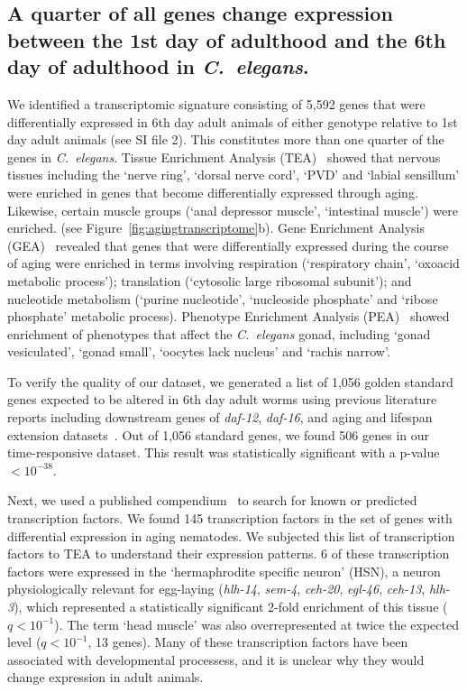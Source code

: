 \documentclass[9pt,twocolumn,twoside]{gsajnl}
\newcommand{\cel}{\emph{C.~elegans}}
\newcommand{\gene}[1]{\emph{\mbox{#1}}}
\newcommand{\agen}{5,592}
\newcommand{\tfaging}{145}
\newcommand{\goldn}{1,056}
\newcommand{\goldfound}{506}
\newcommand{\goldpval}{$<10^{-38}$}
\begin{document}
\subsection{A quarter of all genes change expression between the 1st day of
             adulthood and the 6th day of adulthood in \cel{}.}
We identified a transcriptomic signature consisting of \agen{} genes that were
differentially expressed in 6th day adult animals of either genotype relative
to 1st day adult animals (see SI file 2). This constitutes more than one quarter
of the genes in \cel{}. Tissue Enrichment Analysis (TEA)~\citep{Angeles-Albores2016}
showed that nervous tissues including the `nerve ring', `dorsal nerve cord', `PVD'
and `labial sensillum' were enriched in genes that become differentially expressed
through aging. Likewise, certain muscle groups (`anal depressor muscle', `intestinal
muscle') were enriched. (see Figure~\ref{fig:agingtranscriptome}b). Gene
Enrichment Analysis (GEA)~\citep{Angeles-Albores106369} revealed that genes that
were differentially expressed during the course of aging were enriched in terms
involving respiration (`respiratory chain', `oxoacid metabolic process');
translation (`cytosolic large ribosomal subunit'); and nucleotide metabolism
(`purine nucleotide', `nucleoside phosphate' and `ribose phosphate' metabolic
process). Phenotype Enrichment Analysis (PEA)~\citep{Angeles-Albores106369} showed
enrichment of phenotypes that affect the \cel{} gonad, including `gonad vesiculated',
`gonad small', `oocytes lack nucleus' and `rachis narrow'.

To verify the quality of our dataset, we generated a list of \goldn{} golden
standard genes expected to be altered in 6th day adult worms using previous
literature reports including downstream genes of \gene{daf-12}, \gene{daf-16},
and aging and lifespan extension datasets~\citep{Murphy2003,Halaschek-wiener2005,
Lund2002,McCormick2012,Eckley2013}. Out of \goldn{} standard genes, we found
\goldfound{} genes in our time-responsive dataset. This result was statistically
significant with a p-value \goldpval{}.

Next, we used a published compendium~\citep{Reece-Hoyes2005} to search for known
or predicted transcription factors. We found \tfaging{} transcription factors in
the set of genes with differential expression in aging nematodes. We subjected
this list of transcription factors to TEA to understand their expression
patterns. 6 of these transcription factors were expressed in the `hermaphrodite
specific neuron' (HSN), a neuron physiologically relevant for egg-laying
(\gene{hlh-14}, \gene{sem-4}, \gene{ceh-20}, \gene{egl-46}, \gene{ceh-13},
\gene{hlh-3}), which represented a statistically significant 2-fold enrichment of
this tissue ($q<10^{-1}$). The term `head muscle' was also overrepresented at
twice the expected level ($q<10^{-1}$, 13 genes). Many of these transcription
factors have been  associated with developmental processess, and it is unclear
why they would change expression in adult animals.
\end{document}
